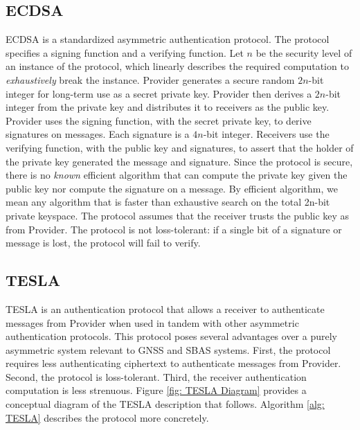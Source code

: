 \documentclass[letterpaper,times]{IONconf/IONconf}
\begin{document}
\subsection{ECDSA}
ECDSA is a standardized asymmetric authentication protocol.
The protocol specifies a signing function and a verifying function.
Let $n$ be the security level of an instance of the protocol, which linearly describes the required computation to {\em exhaustively} break the instance.
Provider generates a secure random $2n$-bit integer for long-term use as a secret private key.
Provider then derives a $2n$-bit integer from the private key and distributes it to receivers as the public key.
Provider uses the signing function, with the secret private key, to derive signatures on messages.
Each signature is a $4n$-bit integer.
Receivers use the verifying function, with the public key and signatures, to assert that the holder of the private key generated the message and signature.
Since the protocol is secure, there is no {\em known} efficient algorithm that can compute the private key given the public key nor compute the signature on a message.
By efficient algorithm, we mean any algorithm that is faster than exhaustive search on the total 2n-bit private keyspace.
The protocol assumes that the receiver trusts the public key as from Provider.
The protocol is not loss-tolerant: if a single bit of a signature or message is lost, the protocol will fail to verify.

\subsection{TESLA} \label{sec: TESLA intro}

TESLA is an authentication protocol that allows a receiver to authenticate messages from Provider when used in tandem with other asymmetric authentication protocols.
This protocol poses several advantages over a purely asymmetric system relevant to GNSS and SBAS systems.
First, the protocol requires less authenticating ciphertext to authenticate messages from Provider.
Second, the protocol is loss-tolerant.
Third, the receiver authentication computation is less strenuous.
Figure \ref{fig: TESLA Diagram} provides a conceptual diagram of the TESLA description that follows.
Algorithm \ref{alg: TESLA} describes the protocol more concretely.
\end{document}
